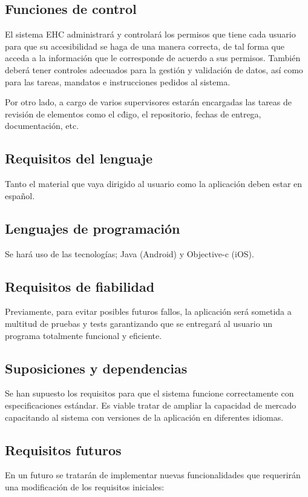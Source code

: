 		
	\subsection{Funciones de control}
		El sistema EHC administrar\'a y controlar\'a los permisos que tiene cada usuario para que su accesibilidad se haga de una manera correcta, de tal forma que acceda a la informaci\'on que le corresponde de acuerdo a sus permisos. Tambi\'en deber\'a tener controles adecuados para la gesti\'on y validaci\'on de datos, as\'i como para las tareas, mandatos e instrucciones pedidos al sistema. 
		
		Por otro lado, a cargo de varios supervisores estar\'an encargadas las tareas de revisi\'on de elementos como el c\'digo, el repositorio, fechas de entrega, documentaci\'on, etc.
	
	\subsection{Requisitos del lenguaje}
		Tanto el material que vaya dirigido al usuario como la aplicaci\'on deben estar en espa\~nol.
	
	\subsection{Lenguajes de programaci\'on}
		Se har\'a uso de las tecnolog\'ias; Java (Android) y Objective-c (iOS).    
	    
	\subsection{Requisitos de fiabilidad}
		Previamente, para evitar posibles futuros fallos, la aplicaci\'on ser\'a sometida a multitud de pruebas y tests garantizando que se entregar\'a al usuario un programa totalmente funcional y eficiente.
	
	\subsection{Suposiciones y dependencias}
		Se han supuesto los requisitos para que el sistema funcione correctamente con especificaciones est\'andar.
		Es viable tratar de ampliar la capacidad de mercado capacitando al sistema con versiones de la aplicaci\'on en diferentes idiomas.
	
	\subsection{Requisitos futuros}
		En un futuro se tratar\'an de implementar nuevas funcionalidades que requerir\'an una modificaci\'on de los requisitos iniciales:
		
